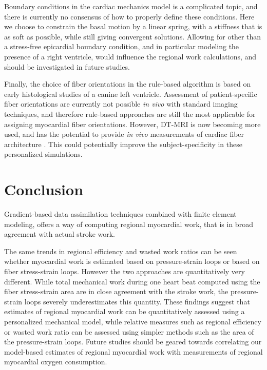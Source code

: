 Boundary conditions in the cardiac mechanics model is a complicated
topic, and there is currently no consensus of how to properly define
these conditions. Here we choose to constrain the basal motion by a
linear spring, with a stiffness that is as soft as possible, while
still giving convergent solutions. Allowing for other than a stress-free epicardial
boundary condition, and in particular modeling the presence of a right
ventricle, would influence the regional work calculations, and should
be investigated in future studies.



Finally, the choice of fiber orientations in the rule-based algorithm is based
on early histological studies \cite{streeter1969fiber} of a canine left
ventricle. Assessment of patient-specific fiber orientations are
currently not possible \emph{in vivo} with standard imaging techniques,
and therefore rule-based approaches are still the most
applicable for assigning myocardial fiber orientations. However,
DT-MRI is now becoming more used, and has the potential to provide
\emph{in vivo} measurements of cardiac fiber architecture
\cite{toussaint2013vivo}. This could potentially improve the
subject-specificity in these personalized simulations.


\section{Conclusion}

Gradient-based data assimilation techniques combined with finite
element modeling, offers a way of computing regional myocardial
work, that is in broad agreement with actual stroke work.

The same trends in regional efficiency and wasted work ratios can be seen
whether myocardial work is estimated based on pressure-strain loops or
based on fiber stress-strain loops. However the two approaches are
quantitatively very different. While total mechanical work during one
heart beat computed using the fiber stress-strain area are in close
agreement with the stroke work, the pressure-strain loops severely
underestimates this quantity. These findings suggest that estimates of regional myocardial
work can be quantitatively assessed using a personalized mechanical
model, while relative measures such as regional efficiency or wasted
work ratio can be assessed using simpler methods such as the area of
the pressure-strain loops. Future studies should be geared towards correlating our model-based
estimates of regional myocardial work with measurements of regional
myocardial oxygen consumption. 



